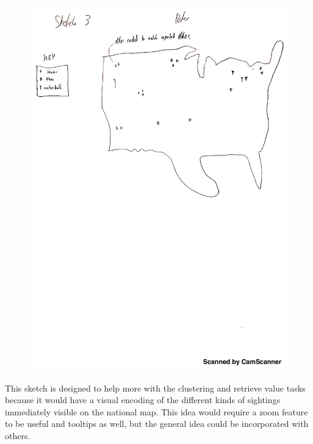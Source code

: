 \documentclass{neu_handout}
\begin{document}
\begin{figure}[h]
\centering
{
\includegraphics[width=0.7\linewidth]{peter3}
}
\end{figure}
This sketch is designed to help more with the clustering and retrieve value tasks because it would have a visual encoding of the different kinds of sightings immediately visible on the national map. This idea would require a zoom feature to be useful and tooltips as well, but the general idea could be incorporated with others.\\\\
\end{document}
